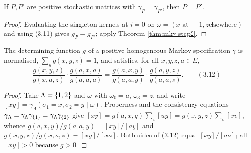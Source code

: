 \begin{corollary}
    \label{cor:mkv-inj}
    \leanok

    If $P, P'$ are positive stochastic matrices with $\gamma_P = \gamma_{P'}$, then $P = P'$.
\end{corollary}
\begin{proof}
    \leanok

    Evaluating the singleton kernels at $i = 0$ on $\omega = (x \text{ at } -1, z \text{
    elsewhere})$ and using (3.11) gives $g_P = g_{P'}$; apply Theorem \ref{thm:mkv-step2}.
\end{proof}

\begin{theorem}
    \label{thm:mkv-312}
    \leanok

    The determining function $g$ of a positive homogeneous Markov specification $\gamma$ is
    normalised, $\sum_y g(x,y,z) = 1$, and satisfies, for all $x,y,z,a \in E$,
    \[
        \frac{g(x,y,z)}{g(x,a,z)}\cdot\frac{g(a,x,a)}{g(a,a,a)}
          = \frac{g(a,x,y)}{g(a,a,y)}\cdot\frac{g(a,y,z)}{g(a,a,z)}. \qquad (3.12)
    \]
\end{theorem}
\begin{proof}
    \leanok

    Take $\Lambda = \left\{ 1,2 \right\}$ and $\omega$ with $\omega_0 = a$, $\omega_3 = z$, and write
    $[xy] = \gamma_\Lambda(\sigma_1 = x, \sigma_2 = y \mid \omega)$. Properness and the
    consistency equations $\gamma_\Lambda = \gamma_\Lambda\gamma_{\left\{ 1 \right\}} =
    \gamma_\Lambda\gamma_{\left\{ 2 \right\}}$ give $[xy] = g(a,x,y)\sum_u [uy] = g(x,y,z)\sum_v [xv]$,
    whence $g(a,x,y)/g(a,a,y) = [xy]/[ay]$ and $g(x,y,z)/g(x,a,z) = [xy]/[xa]$. Both sides of
    (3.12) equal $[xy]/[aa]$; all $[xy] > 0$ because $g > 0$.
\end{proof}

